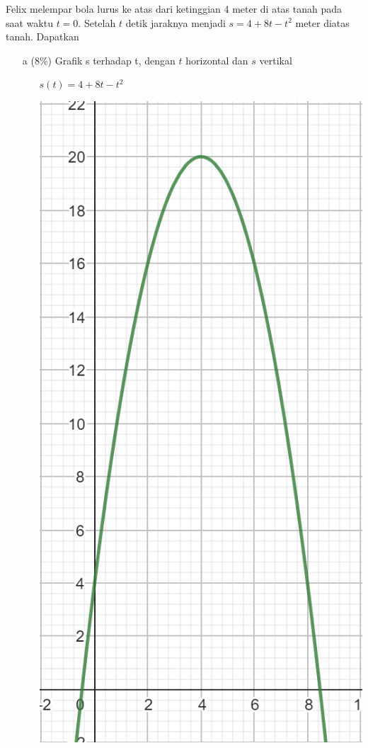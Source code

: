 \documentclass[12pt, a4paper]{article}
\begin{document}
    Felix melempar bola lurus ke atas dari ketinggian 4 meter di atas tanah pada saat waktu $t = 0$. Setelah $t$ detik jaraknya menjadi $s = 4 + 8t - t^2$ meter diatas tanah. Dapatkan
    \begin{enumerate}
        \item[a] (8\%) Grafik s terhadap t, dengan $t$ horizontal dan $s$ vertikal
        \begin{enumerate}
            \item[] $s(t)=4 + 8t - t^2$
            \item[] \includegraphics[scale=0.2]{5a.png}

\end{enumerate}
\end{enumerate}
\end{document}

